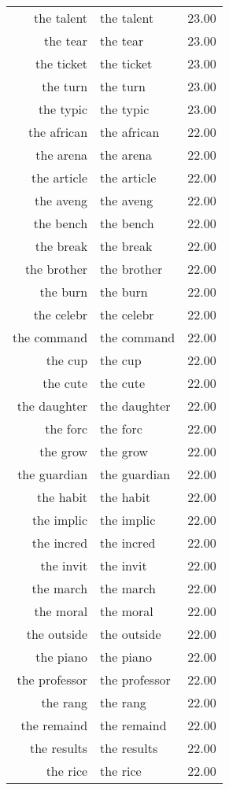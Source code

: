 \begin{table}[ht]
\begin{tabular}{rlr}
  the talent & the talent & 23.00 \\ 
  the tear & the tear & 23.00 \\ 
  the ticket & the ticket & 23.00 \\ 
  the turn & the turn & 23.00 \\ 
  the typic & the typic & 23.00 \\ 
  the african & the african & 22.00 \\ 
  the arena & the arena & 22.00 \\ 
  the article & the article & 22.00 \\ 
  the aveng & the aveng & 22.00 \\ 
  the bench & the bench & 22.00 \\ 
  the break & the break & 22.00 \\ 
  the brother & the brother & 22.00 \\ 
  the burn & the burn & 22.00 \\ 
  the celebr & the celebr & 22.00 \\ 
  the command & the command & 22.00 \\ 
  the cup & the cup & 22.00 \\ 
  the cute & the cute & 22.00 \\ 
  the daughter & the daughter & 22.00 \\ 
  the forc & the forc & 22.00 \\ 
  the grow & the grow & 22.00 \\ 
  the guardian & the guardian & 22.00 \\ 
  the habit & the habit & 22.00 \\ 
  the implic & the implic & 22.00 \\ 
  the incred & the incred & 22.00 \\ 
  the invit & the invit & 22.00 \\ 
  the march & the march & 22.00 \\ 
  the moral & the moral & 22.00 \\ 
  the outside & the outside & 22.00 \\ 
  the piano & the piano & 22.00 \\ 
  the professor & the professor & 22.00 \\ 
  the rang & the rang & 22.00 \\ 
  the remaind & the remaind & 22.00 \\ 
  the results & the results & 22.00 \\ 
  the rice & the rice & 22.00 \\ 

\end{tabular}
\end{table}
